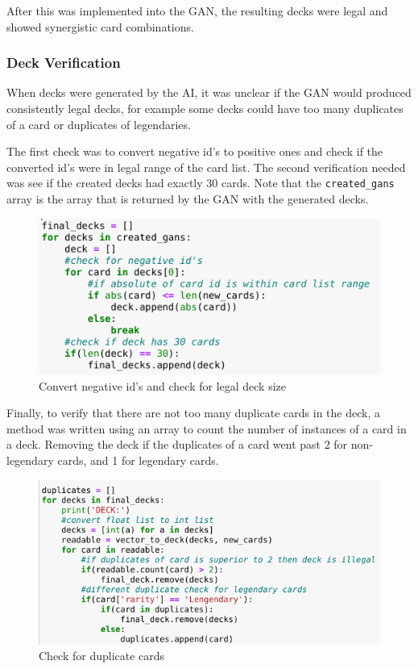 \documentclass{report} %
\begin{document}
After this was implemented into the GAN, the resulting decks were legal and showed synergistic card combinations. 

\subsubsection{Deck Verification}

When decks were generated by the AI, it was unclear if the GAN would produced consistently legal decks, for example some decks could have too many duplicates of a card or duplicates of legendaries.

The first check was to convert negative id's to positive ones and check if the converted id's were in legal range of the card list. The second verification needed was see if the created decks had exactly 30 cards. Note that the \nolinkurl{created_gans} array is the array that is returned by the GAN with the generated decks.

\begin{figure}[H]
\centering
\includegraphics[width=1\textwidth]{abs}
\caption{Convert negative id's and check for legal deck size \protect}
 \label{board}
\end{figure}

Finally, to verify that there are not too many duplicate cards in the deck, a method was written using an array to count the number of instances of a card in a deck. Removing the deck if the duplicates of a card went past 2 for non-legendary cards, and 1 for legendary cards.

\begin{figure}[H]
\centering
\includegraphics[width=1\textwidth]{duplicates}
\caption{Check for duplicate cards \protect}
 \label{board}
\end{figure}
\end{document}
